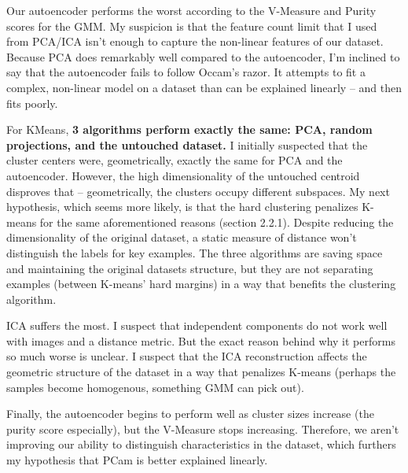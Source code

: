 \documentclass[letter]{article}
\begin{document}
Our autoencoder performs the worst according to the V-Measure and Purity scores for the GMM. My suspicion is that the feature count limit that I used from PCA/ICA isn't enough to capture the non-linear features of our dataset. Because PCA does remarkably well compared to the autoencoder, I'm inclined to say that the autoencoder fails to follow Occam's razor. It attempts to fit a complex, non-linear model on a dataset than can be explained linearly -- and then fits poorly.

For KMeans, \textbf{3 algorithms perform exactly the same: PCA, random projections, and the untouched dataset.} I initially suspected that the cluster centers were, geometrically, exactly the same for PCA and the autoencoder. However, the high dimensionality of the untouched centroid disproves that -- geometrically, the clusters occupy different subspaces. My next hypothesis, which seems more likely, is that the hard clustering penalizes K-means for the same aforementioned reasons (section 2.2.1). Despite reducing the dimensionality of the original dataset, a static measure of distance won't distinguish the labels for key examples. The three algorithms are saving space and maintaining the original datasets structure, but they are not separating examples (between K-means' hard margins) in a way that benefits the clustering algorithm.

ICA suffers the most. I suspect that independent components do not work well with images and a distance metric. But the exact reason behind why it performs so much worse is unclear. I suspect that the ICA reconstruction affects the geometric structure of the dataset in a way that penalizes K-means (perhaps the samples become homogenous, something GMM can pick out).

Finally, the autoencoder begins to perform well as cluster sizes increase (the purity score especially), but the V-Measure stops increasing. Therefore, we aren't improving our ability to distinguish characteristics in the dataset, which furthers my hypothesis that PCam is better explained linearly.
\end{document}
